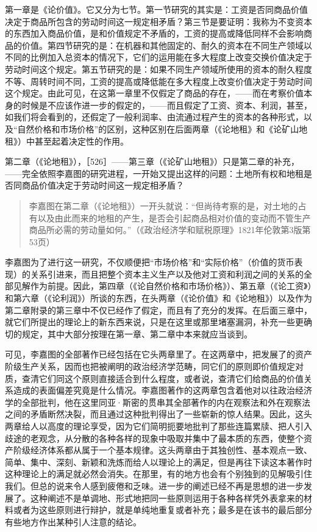 第一章是《论价值》。它又分为七节。第一节研究的其实是：工资是否同商品价值决定于商品所包含的劳动时间这一规定相矛盾？第三节是要证明：我称为不变资本的东西加入商品价值，是和价值规定不矛盾的，工资的提高或降低同样不会影响商品的价值。第四节研究的是：在机器和其他固定的、耐久的资本在不同生产领域以不同的比例加入总资本的情况下，它们的运用能在多大程度上改变交换价值决定于劳动时间这个规定。第五节研究的是：如果不同生产领域所使用的资本的耐久程度不等、周转时间不同，工资的提高或降低能在多大程度上改变价值决定于劳动时间这个规定。由此可见，在这第一章里不仅假定了商品的存在，——而在考察价值本身的时候是不应该作进一步的假定的，——而且假定了工资、资本、利润，甚至，如我们将会看到的，还假定了一般利润率、由流通过程产生的资本的各种形式，以及“自然价格和市场价格”的区别，这种区别在后面两章（《论地租》和《论矿山地租》）中甚至起着决定性的作用。

第二章（《论地租》），［526］——第三章（《论矿山地租》）只是第二章的补充，——完全依照李嘉图的研究进程，一开始又提出这样的问题：土地所有权和地租是否同商品价值决定于劳动时间这一规定相矛盾？

\begin{quote}{李嘉图在第二章（《论地租》）一开头就说：“但尚待考察的是，对土地的占有以及由此而来的地租的产生，是否会引起商品相对价值的变动而不管生产商品所必需的劳动量如何。”（《政治经济学和赋税原理》1821年伦敦第3版第53页）}\end{quote}

李嘉图为了进行这一研究，不仅顺便把“市场价格”和“实际价格”（价值的货币表现）的关系引进来，而且把整个资本主义生产以及他对工资和利润之间的关系的全部见解作为前提。因此，第四章（《论自然价格和市场价格》）、第五章（《论工资》）和第六章（《论利润》）所谈的东西，在头两章（《论价值》和《论地租》）以及作为第二章附录的第三章中不仅已经作了假定，而且有了充分的发挥。在后面三章中，就它们所提出的理论上的新东西来说，只是在这里或那里堵塞漏洞，补充一些更确切的规定，其中大部分按理在第一章、第二章中本来就应当谈到。

可见，李嘉图的全部著作已经包括在它头两章里了。在这两章中，把发展了的资产阶级生产关系，因而也把被阐明的政治经济学范畴，同它们的原则即价值规定对质，查清它们同这个原则直接适合到什么程度，或者说，查清它们给商品的价值关系造成的表面偏差究竟是什么情况。李嘉图著作的这两章包含着他对以往政治经济学的全部批判，他在这里同亚·斯密的贯串其全部著作的内在观察法和外在观察法之间的矛盾断然决裂，而且通过这种批判得出了一些崭新的惊人结果。因此，这头两章给人以高度的理论享受，因为它们简明扼要地批判了那些连篇累牍、把人引入歧途的老观念，从分散的各种各样的现象中吸取并集中了最本质的东西，使整个资产阶级经济体系都从属于一个基本规律。这头两章由于其独创性、基本观点一致、简单、集中、深刻、新颖和洗炼而给人以理论上的满足，但是再往下读这本著作时这种理论上的满足就必然会消失。在那里，有的地方也会有个别独到的见解吸引住我们。但总的说来令人感到疲倦和乏味。进一步的阐述已经不再是思想的进一步发展了。这种阐述不是单调地、形式地把同一些原则运用于各种各样凭外表拿来的材料或者为这些原则进行辩护，就是单纯地重复或者补充；最多是在该书的最后部分有些地方作出某种引人注意的结论。

